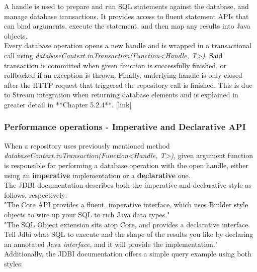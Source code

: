 A handle is used to prepare and run SQL statements against the database, and manage database transactions.
It provides access to fluent statement APIs that can bind arguments, execute the statement, and then map any results into Java objects.\\

Every database operation opens a new handle and is wrapped in a transactional call using \textit{databaseContext.inTransaction(Function<Handle, T>)}.
Said transaction is committed when given function is successfully finished, or rollbacked if an exception is thrown. Finally, underlying handle
is only closed after the HTTP request that triggered the repository call is finished. This is due to Stream integration when returning database
elements and is explained in greater detail in **Chapter 5.2.4**. [link]

\subsubsection{Performance operations - Imperative and Declarative API}

When a repository uses previously mentioned method \textit{databaseContext.inTransaction(Function<Handle, T>)}, given argument function is responsible
for performing a database operation with the open handle, either using an \textbf{imperative} implementation or a \textbf{declarative} one.\\

The JDBI documentation describes both the imperative and declarative style as follows, respectively:\\

"The Core API provides a fluent, imperative interface, which uses Builder style objects to wire up your SQL to rich Java data types."\\

"The SQL Object extension sits atop Core, and provides a declarative interface. Tell Jdbi what SQL to execute and the shape of the results
you like by declaring an annotated Java \textit{interface}, and it will provide the implementation."\\

Additionally, the JDBI documentation offers a simple query example using both styles:\\

